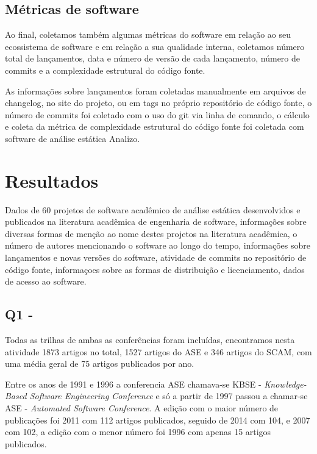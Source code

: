 \subsection{Métricas de software}

Ao final, coletamos também algumas métricas do software em relação ao seu
ecossistema de software e em relação a sua qualidade interna, coletamos número
total de lançamentos, data e número de versão de cada lançamento, número de
commits e a complexidade estrutural do código fonte.

As informações sobre lançamentos foram coletadas manualmente em arquivos de
changelog, no site do projeto, ou em tags no próprio repositório de código
fonte, o número de commits foi coletado com o uso do git via linha de comando,
o cálculo e coleta da métrica de complexidade estrutural do código fonte foi
coletada com software de análise estática Analizo.

\section{Resultados} %

Dados de 60 projetos de software acadêmico de análise estática desenvolvidos e
publicados na literatura acadêmica de engenharia de software, informações sobre
diversas formas de menção ao nome destes projetos na literatura acadêmica,
o número de autores mencionando o software ao longo do tempo, informações sobre
lançamentos e novas versões do software, atividade de commits no repositório
de código fonte, informaçoes sobre as formas de distribuição e licenciamento,
dados de acesso ao software.

\subsection{Q1 - \QuestaoUm}

Todas as trilhas de ambas as conferências foram incluídas,
encontramos nesta atividade 1873 artigos no total, 1527 artigos do ASE e 346
artigos do SCAM, com uma média geral de 75 artigos publicados por ano. 

Entre os anos de 1991 e 1996 a conferencia ASE chamava-se KBSE - {\it
Knowledge-Based Software Engineering Conference} e só a partir de 1997 passou a
chamar-se ASE - {\it Automated Software Conference}. A edição com o maior
número de publicações foi 2011 com 112 artigos publicados, seguido de 2014 com
104, e 2007 com 102, a edição com o menor número foi 1996 com apenas 15 artigos
publicados.

